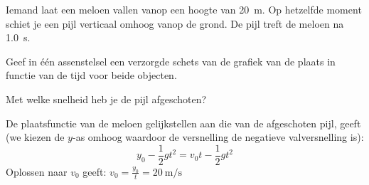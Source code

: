 \documentclass{ximera}
\begin{document}
\begin{exercise}
    Iemand laat een meloen vallen vanop een hoogte van \SI{20}{m}. Op hetzelfde moment schiet je een pijl verticaal omhoog vanop de grond. De pijl treft de meloen na \SI{1,0}{s}. 
    \begin{question} Geef in één assenstelsel een verzorgde schets van de grafiek van de plaats in functie van de tijd voor beide objecten. 
        \begin{oplossing} 


        \end{oplossing} 
    \end{question}
    \begin{question} 
        Met welke snelheid heb je de pijl afgeschoten?  
        \begin{oplossing} 
            De plaatsfunctie van de meloen gelijkstellen aan die van de afgeschoten pijl, geeft (we kiezen de $y$-as omhoog waardoor de versnelling de negatieve valversnelling is):
            \[
               y_0-\frac{1}{2}gt^2 = v_0t-\frac{1}{2}gt^2
            \]
            Oplossen naar $v_0$ geeft: $v_0=\frac{y_0}{t}=\SI{20}{\meter\per\second}$ 
        \end{oplossing} 
    \end{question}

\end{exercise}
\end{document}
